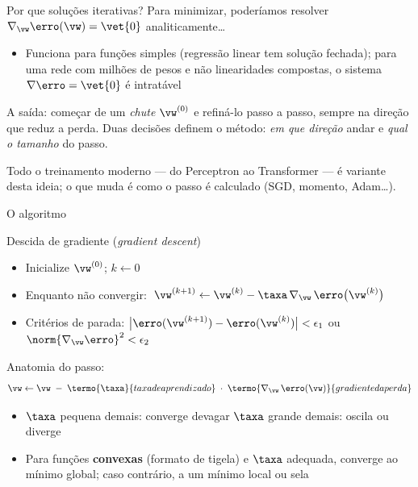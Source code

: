 \documentclass[aspectratio=169, 11pt]{beamer}
\begin{document}
\begin{frame}{Por que soluções iterativas?}
  Para minimizar, poderíamos resolver $\nabla_{\vw} \erro(\vw) = \vet{0}$
  analiticamente\dots

  \begin{itemize}\setlength{\itemsep}{0.2ex}
    \item Funciona para funções simples (regressão linear tem solução fechada);
          para uma rede com milhões de pesos e não linearidades compostas, o
          sistema $\nabla \erro = \vet{0}$ é \alert{intratável}
  \end{itemize}

  \begin{ideiabox}
    A saída: começar de um \emph{chute} $\vw^{(0)}$ e refiná-lo passo a passo,
    sempre na direção que reduz a perda. Duas decisões definem o método:
    \emph{em que direção} andar e \emph{qual o tamanho} do passo.
  \end{ideiabox}

  \begin{alertabox}
    Todo o treinamento moderno — do Perceptron ao Transformer — é variante desta
    ideia; o que muda é como o passo é calculado (SGD, momento, Adam\dots).
  \end{alertabox}
\end{frame}

\begin{frame}{O algoritmo}
  \begin{algbox}{Descida de gradiente (\emph{gradient descent})}
    \begin{itemize}\setlength{\itemsep}{0.2ex}
      \item Inicialize $\vw^{(0)}$; $k \leftarrow 0$
      \item Enquanto não convergir:
            \(\;\vw^{(k+1)} \leftarrow \vw^{(k)} - \taxa\, \nabla_{\vw}\, \erro\big(\vw^{(k)}\big)\)
      \item Critérios de parada:
            \(\big|\erro(\vw^{(k+1)}) - \erro(\vw^{(k)})\big| < \epsilon_1\)
            \;ou\; \(\norm{\nabla_{\vw} \erro}^2 < \epsilon_2\)
    \end{itemize}
  \end{algbox}

  Anatomia do passo:
  \[
    \vw \leftarrow \vw
      \;-\; \termo{\taxa}{taxa de aprendizado}
      \;\cdot\; \termo{\nabla_{\vw}\, \erro(\vw)}{gradiente da perda}
  \]

  \begin{itemize}\setlength{\itemsep}{0.2ex}
    \item $\taxa$ pequena demais: converge devagar \quad\textbullet\quad
          $\taxa$ grande demais: oscila ou diverge
    \item Para funções \textbf{convexas} (formato de tigela) e $\taxa$ adequada,
          converge ao mínimo \alert{global}; caso contrário, a um mínimo local ou sela
  \end{itemize}
\end{frame}
\end{document}
